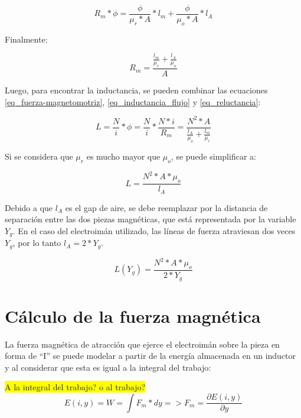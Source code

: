 \begin{equation}
		R_{m}*\phi=\frac{\phi}{\mu_{r}*A}*l_{m}+\frac{\phi}{\mu_{o}*A}*l_{A}
\end{equation}

\noindent Finalmente:

\begin{equation} \label{eq_reluctancia}
	R_{m}=\frac{\frac{l_{m}}{\mu_{r}}+\frac{l_{A}}{\mu_{o}}}{A}
\end{equation}

\noindent Luego, para encontrar la inductancia, se pueden combinar las ecuaciones  \ref{eq_fuerza-magnetomotriz}, \ref{eq_inductancia_flujo} y \ref{eq_reluctancia}:

\begin{equation}\label{eq_inductancia_2}
	L=\frac{N}{i}*\phi=\frac{N}{i}*\frac{N*i}{R_{m}}=\frac{N^{2}*A}{\frac{l_{A}}{\mu_{o}}+\frac{l_{m}}{\mu_{r}}}
\end{equation}

\noindent Si se considera que $\mu_{r}$ es mucho mayor que $\mu_{o}$, se puede simplificar a:

\begin{equation} \label{eq_inductancia_gap}
	L=\frac{N^{2}*A*\mu_{o}}{l_{A}}
\end{equation}

\noindent \noindent Debido a que $l_{A}$ es el gap de aire, se debe reemplazar por la distancia de separación entre las dos piezas magnéticas, que está representada por la variable $Y_{g}$. En el caso del electroimán utilizado, las líneas de fuerza atraviesan dos veces $Y_{g}$, por lo tanto $l_{A}=2*Y_{g}$.


\begin{equation}\label{eq_inductancia_vs_y}
		L(Y_g)=\frac{{N^{2}*A*\mu_{o}}}{2*Y_{g}}
\end{equation}

\section{Cálculo de la fuerza magnética}

\noindent La fuerza magnética de atracción que ejerce el electroimán sobre la pieza en forma de ``I'' se puede modelar a partir de la energía almacenada en un inductor y al considerar que esta es igual a la integral del trabajo:
\noindent

\colorbox{yellow}{A la integral del trabajo? o al trabajo?}
\begin{equation}\label{eq_energia}
	E(i,y)=W=\int{F_{m}*dy}=>F_{m}=\frac{\partial{E(i,y)}}{\partial{y}}
\end{equation}

